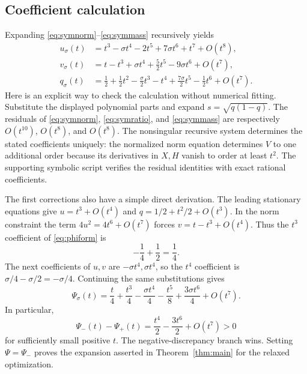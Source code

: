 \documentclass[11pt]{article}
\theoremstyle{definition}
\newcommand{\1}{\mathbf 1}
\begin{document}
\subsection{Coefficient calculation}
Expanding \eqref{eq:symnorm}--\eqref{eq:symmass} recursively yields
\begin{align}
 u_\sigma(t)&=t^3-\sigma t^4-2t^5+7\sigma t^6+t^7+O(t^8),\label{eq:usigned}\\
 v_\sigma(t)&=t-t^3+\sigma t^4+\tfrac52t^5-9\sigma t^6+O(t^7),\label{eq:vsigned}\\
 q_\sigma(t)&=\tfrac12+\tfrac12t^2-\tfrac\sigma2t^3-t^4
           +\tfrac{7\sigma}2t^5-\tfrac12t^6+O(t^7).\label{eq:qsigned}
\end{align}
Here is an explicit way to check the calculation without numerical fitting. Substitute the displayed polynomial parts and expand $s=\sqrt{q(1-q)}$. The residuals of \eqref{eq:symnorm}, \eqref{eq:symratio}, and \eqref{eq:symmass} are respectively $O(t^{10})$, $O(t^8)$, and $O(t^8)$. The nonsingular recursive system determines the stated coefficients uniquely: the normalized norm equation determines $V$ to one additional order because its derivatives in $X,H$ vanish to order at least $t^2$. The supporting symbolic script verifies the residual identities with exact rational coefficients.

The first corrections also have a simple direct derivation. The leading stationary equations give $u=t^3+O(t^4)$ and $q=1/2+t^2/2+O(t^3)$. In the norm constraint the term $4u^2=4t^6+O(t^7)$ forces $v=t-t^3+O(t^4)$. Thus the $t^3$ coefficient of \eqref{eq:phiform} is
\[
 -\frac14+\frac12=\frac14.
\]
The next coefficients of $u,v$ are $-\sigma t^4,\sigma t^4$, so the $t^4$ coefficient is $\sigma/4-\sigma/2=-\sigma/4$. Continuing the same substitutions gives
\begin{equation}\label{eq:signedvalue}
 \Psi_\sigma(t)=\frac t4+\frac{t^3}4-\frac{\sigma t^4}4
                -\frac{t^5}8+\frac{3\sigma t^6}4+O(t^7).
\end{equation}
In particular,
\[
 \Psi_-(t)-\Psi_+(t)=\frac{t^4}2-\frac{3t^6}2+O(t^7)>0
\]
for sufficiently small positive $t$. The negative-discrepancy branch wins. Setting $\Psi=\Psi_-$ proves the expansion asserted in Theorem~\ref{thm:main} for the relaxed optimization.
\end{document}
